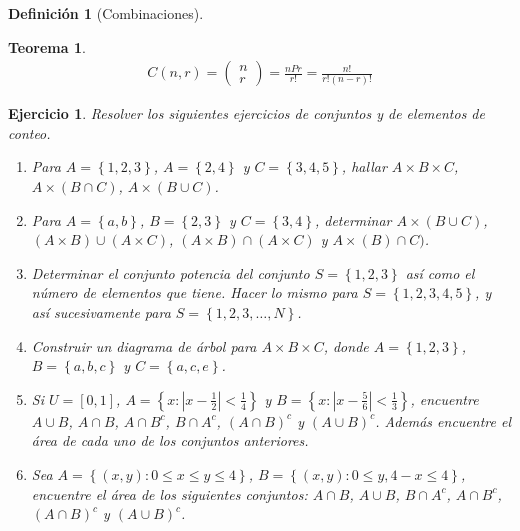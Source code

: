 \documentclass[12pt,twoside]{article}
\newtheorem{Def}{Definici\'on}
\newtheorem{Teo}{Teorema}
\newtheorem{Ejer}{Ejercicio}
\begin{document}
\begin{Def}[Combinaciones]

\end{Def}


\begin{Teo}
\begin{eqnarray}
C\left(n,r\right)=\left(\begin{array}{c}
n\\
r
\end{array}\right)=\frac{nPr}{r!}=\frac{n!}{r!\left(n-r\right)!}
\end{eqnarray}
\end{Teo}

\begin{Ejer} Resolver los siguientes ejercicios de conjuntos y de elementos de conteo.
\begin{enumerate}

\item Para $A=\left\{1,2,3\right\}$, $A=\left\{2,4\right\}$ y $C=\left\{3,4,5\right\}$, hallar $A\times B\times C$, $A\times (B\cap C)$, $A\times (B\cup C)$.


\item Para $A=\left\{a,b\right\}$, $B=\left\{2,3\right\}$ y $C=\left\{3,4\right\}$, determinar $A\times (B\cup C)$, $(A\times B)\cup (A\times C)$, $(A\times B)\cap (A\times C)$ y $A\times (B)\cap C)$.

\item Determinar el conjunto potencia del conjunto $S=\left\{1,2,3\right\}$ as\'i como el n\'umero de elementos que tiene. Hacer lo mismo para $S=\left\{1,2,3,4,5\right\}$, y as\'i sucesivamente para $S=\left\{1,2,3,\ldots, N\right\}$.

\item Construir un diagrama de \'arbol para $A\times B\times C$, donde $A=\left\{1,2,3\right\}$,  $B=\left\{a,b,c\right\}$ y $C=\left\{a,c,e\right\}$.


\item Si $U=\left[0,1\right]$, $A=\left\{x:|x-\frac{1}{2}|<\frac{1}{4}\right\}$ y $B=\left\{x:|x-\frac{5}{6}|<\frac{1}{3}\right\}$, encuentre $A\cup B$, $A\cap B$, $A\cap B^{c}$, $B\cap A^{c}$, $\left(A\cap B\right)^{c}$ y $\left(A\cup B\right)^{c}$. Adem\'as encuentre el \'area de cada uno de los conjuntos anteriores.


\item Sea $A=\left\{\left(x,y\right):0\leq x\leq y\leq4\right\}$, $B=\left\{\left(x,y\right):0\leq y, 4-x\leq4\right\}$, encuentre el \'area de los siguientes conjuntos: $A\cap B$, $A\cup B$, $B\cap A^{c}$, $A\cap B^{c}$, $\left(A\cap B\right)^{c}$ y $\left(A\cup B\right)^{c}$.



\end{enumerate}
\end{Ejer}
\end{document}
